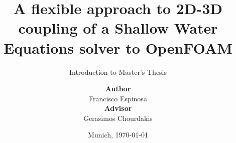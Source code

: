 %
% 
% 
%
\newcommand{\shiftedframetitle}[1]{\frametitle{\\\vspace{-2cm}#1}\vspace{0.5cm}}





\newcommand{\Datum}{\today}

\renewcommand{\PraesentationFusszeileZusatz}{| Introduction to Master's Thesis}

\title{A flexible approach to 2D-3D coupling of a Shallow Water Equations solver to OpenFOAM}
\subtitle{Introduction to Master's Thesis}
\author{\vspace{0.5cm}\textbf{Author}\\Francisco Espinosa \\[0.2cm] \textbf{Advisor} \\Gerasimos Chourdakis}
\date[\Datum]{Munich, \Datum}
\subject{Introduction to Master Thesis}




